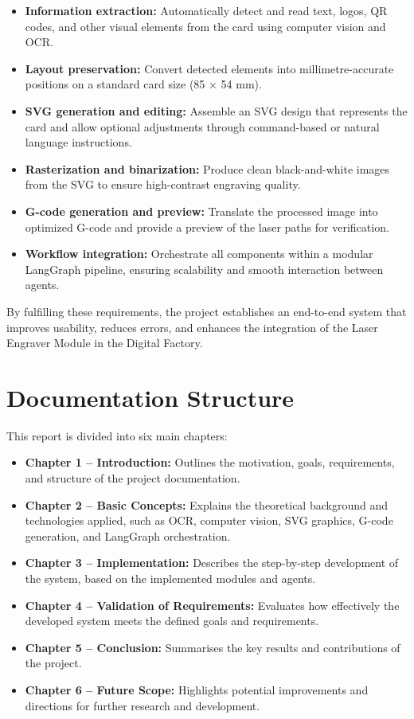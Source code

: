 \begin{itemize}
	\item \textbf{Information extraction:} Automatically detect and read text, logos, QR codes, and other visual elements from the card using computer vision and OCR.
	\item \textbf{Layout preservation:} Convert detected elements into millimetre-accurate positions on a standard card size (85 × 54 mm). 
	\item \textbf{SVG generation and editing:} Assemble an SVG design that represents the card and allow optional adjustments through command-based or natural language instructions.
	\item \textbf{Rasterization and binarization:} Produce clean black-and-white images from the SVG to ensure high-contrast engraving quality.
	\item \textbf{G-code generation and preview:} Translate the processed image into optimized G-code and provide a preview of the laser paths for verification.
	\item \textbf{Workflow integration:} Orchestrate all components within a modular LangGraph pipeline, ensuring scalability and smooth interaction between agents.
\end{itemize}


By fulfilling these requirements, the project establishes an end-to-end system that improves usability, reduces errors, and enhances the integration of the Laser Engraver Module in the Digital Factory.

\section{Documentation Structure}

This report is divided into six main chapters:

\begin{itemize}
\item \textbf{Chapter 1 – Introduction:} Outlines the motivation, goals, requirements, and structure of the project documentation.
\item \textbf{Chapter 2 – Basic Concepts:} Explains the theoretical background and technologies applied, such as OCR, computer vision, SVG graphics, G-code generation, and LangGraph orchestration.
\item \textbf{Chapter 3 – Implementation:} Describes the step-by-step development of the system, based on the implemented modules and agents.
\item \textbf{Chapter 4 – Validation of Requirements:} Evaluates how effectively the developed system meets the defined goals and requirements.
\item \textbf{Chapter 5 – Conclusion:} Summarises the key results and contributions of the project.
\item \textbf{Chapter 6 – Future Scope:} Highlights potential improvements and directions for further research and development.
\end{itemize}